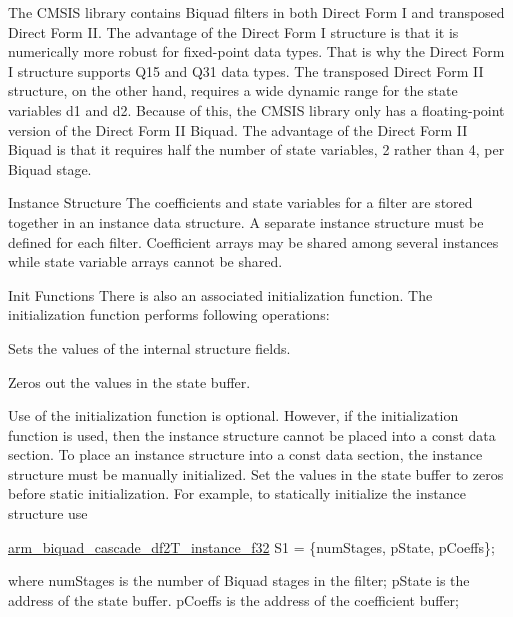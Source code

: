 \begin{DoxyParagraph}{}
The C\-M\-S\-I\-S library contains Biquad filters in both Direct Form I and transposed Direct Form I\-I. The advantage of the Direct Form I structure is that it is numerically more robust for fixed-\/point data types. That is why the Direct Form I structure supports Q15 and Q31 data types. The transposed Direct Form I\-I structure, on the other hand, requires a wide dynamic range for the state variables {\ttfamily d1} and {\ttfamily d2}. Because of this, the C\-M\-S\-I\-S library only has a floating-\/point version of the Direct Form I\-I Biquad. The advantage of the Direct Form I\-I Biquad is that it requires half the number of state variables, 2 rather than 4, per Biquad stage.
\end{DoxyParagraph}
\begin{DoxyParagraph}{Instance Structure }
The coefficients and state variables for a filter are stored together in an instance data structure. A separate instance structure must be defined for each filter. Coefficient arrays may be shared among several instances while state variable arrays cannot be shared.
\end{DoxyParagraph}
\begin{DoxyParagraph}{Init Functions }
There is also an associated initialization function. The initialization function performs following operations\-:
\begin{DoxyItemize}
\item Sets the values of the internal structure fields.
\item Zeros out the values in the state buffer.
\end{DoxyItemize}
\end{DoxyParagraph}
\begin{DoxyParagraph}{}
Use of the initialization function is optional. However, if the initialization function is used, then the instance structure cannot be placed into a const data section. To place an instance structure into a const data section, the instance structure must be manually initialized. Set the values in the state buffer to zeros before static initialization. For example, to statically initialize the instance structure use 
\begin{DoxyPre}   
    \hyperlink{structarm__biquad__cascade__df2_t__instance__f32}{arm\_biquad\_cascade\_df2T\_instance\_f32} S1 = \{numStages, pState, pCoeffs\};   
\end{DoxyPre}
 where {\ttfamily num\-Stages} is the number of Biquad stages in the filter; {\ttfamily p\-State} is the address of the state buffer. {\ttfamily p\-Coeffs} is the address of the coefficient buffer; 
\end{DoxyParagraph}


